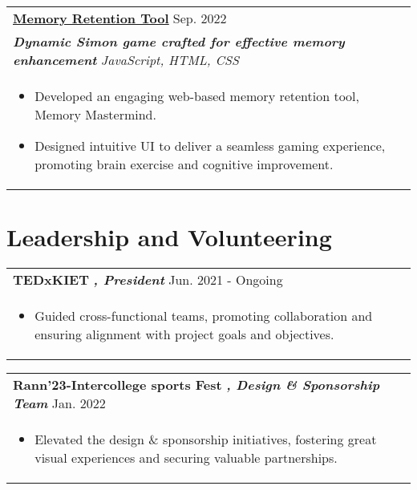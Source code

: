 \documentclass[a4paper,8pt]{article}
\begin{document}
\begin{tabularx}{\linewidth}{ @{}l r@{} }
\color[HTML]{1C033C} \textbf{\uline{\href{https://github.com/githamdaan25/Memory-Retention-Tool}{Memory Retention Tool}}} \hfill \color[HTML]{371e77} Sep. 2022 \\[4pt]
\color[HTML]{371e77}\textbf{\textit{Dynamic Simon game crafted for effective memory enhancement}} \hfill \color[HTML]{4B28A4} \textit{JavaScript, HTML, CSS} \\[5pt]
\begin{minipage}[t]{\linewidth}
    \begin{itemize}[nosep,after=\strut, leftmargin=2em, itemsep=2pt]
        \item Developed an engaging web-based memory retention tool, Memory Mastermind.
        \item Designed intuitive UI to deliver a seamless gaming experience, promoting brain exercise and cognitive improvement.
    \end{itemize}
    \end{minipage}
\end{tabularx}



\section{Leadership and Volunteering}
\begin{tabularx}{\linewidth}{ @{}l r@{} }
\color[HTML]{1C033C} \textbf{TEDxKIET} \color[HTML]{371e77}\textbf{\textit{, President}} \hfill \color[HTML]{371e77} Jun. 2021 - Ongoing \\[5pt]
\begin{minipage}[t]{\linewidth}
    \begin{itemize}[nosep,after=\strut, leftmargin=2em, itemsep=2pt]
        \item Guided cross-functional teams, promoting collaboration and ensuring alignment with project goals and objectives.
    \end{itemize}
\end{minipage}
\end{tabularx}
\begin{tabularx}{\linewidth}{ @{}l r@{} }
\color[HTML]{1C033C} \textbf{Rann'23-Intercollege sports Fest} \color[HTML]{371e77}\textbf{\textit{, Design \& Sponsorship Team}} \hfill \color[HTML]{371e77} Jan. 2022 \\[5pt]
\begin{minipage}[t]{\linewidth}
    \begin{itemize}[nosep,after=\strut, leftmargin=2em, itemsep=2pt]
        \item Elevated the design \& sponsorship initiatives, fostering great visual experiences and securing valuable partnerships.
    \end{itemize}
\end{minipage}
\end{tabularx}
\end{document}
